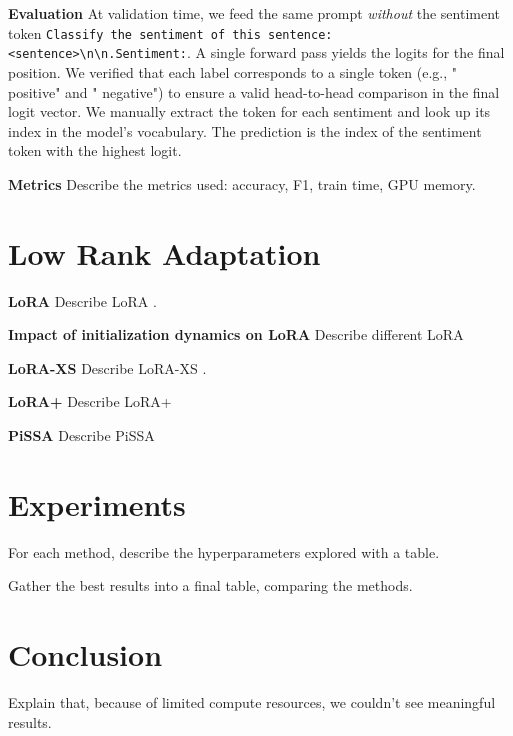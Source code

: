\documentclass[a4paper,10pt,twocolumn,english]{article}
\begin{document}
\noindent\textbf{Evaluation} At validation time, we feed the same prompt \emph{without} the sentiment token \texttt{Classify the sentiment of this sentence: <sentence>\textbackslash n\textbackslash n.Sentiment:}. A single forward pass yields the logits for the final position. We verified that each label corresponds to a single token (e.g., " positive" and " negative") to ensure a valid head-to-head comparison in the final logit vector. We manually extract the token for each sentiment and look up its index in the model's vocabulary. The prediction is the index of the sentiment token with the highest logit. 

\noindent\textbf{Metrics} Describe the metrics used: accuracy, F1, train time, GPU memory.

\section{Low Rank Adaptation}
\noindent\textbf{LoRA} Describe LoRA \cite{hu2021loralowrankadaptationlarge}.

\noindent\textbf{Impact of initialization dynamics on LoRA} Describe different LoRA \cite{hayou2024impactinitializationlorafinetuning}

\noindent\textbf{LoRA-XS} Describe LoRA-XS \cite{balazy2024loraxslowrankadaptationextremely}.

\noindent\textbf{LoRA+} Describe LoRA+ \cite{hayou2024loraefficientlowrank}

\noindent\textbf{PiSSA} Describe PiSSA \cite{meng2025pissaprincipalsingularvalues}

\section{Experiments}
For each method, describe the hyperparameters explored with a table.

Gather the best results into a final table, comparing the methods.

\section{Conclusion}
Explain that, because of limited compute resources, we couldn't see meaningful results.



\end{document}
